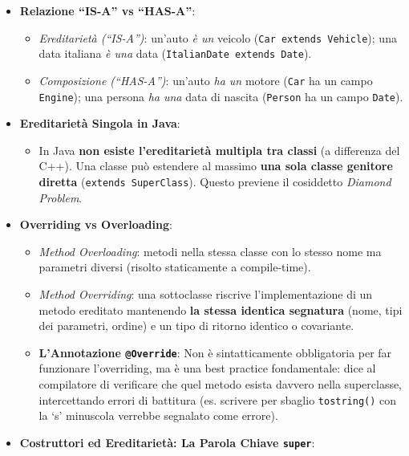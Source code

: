 \documentclass[11pt,a4paper]{article}
\newcommand{\passthrough}[1]{#1}
\providecommand{\tightlist}{\setlength{\itemsep}{0pt}\setlength{\parskip}{0pt}}
\begin{document}
\begin{itemize}
\tightlist
\item
  \textbf{Relazione ``IS-A'' vs ``HAS-A''}:

  \begin{itemize}
  \tightlist
  \item
    \emph{Ereditarietà (``IS-A'')}: un'auto \emph{è un} veicolo
    (\passthrough{\lstinline!Car extends Vehicle!}); una data italiana
    \emph{è una} data
    (\passthrough{\lstinline!ItalianDate extends Date!}).
  \item
    \emph{Composizione (``HAS-A'')}: un'auto \emph{ha un} motore
    (\passthrough{\lstinline!Car!} ha un campo
    \passthrough{\lstinline!Engine!}); una persona \emph{ha una} data di
    nascita (\passthrough{\lstinline!Person!} ha un campo
    \passthrough{\lstinline!Date!}).
  \end{itemize}
\item
  \textbf{Ereditarietà Singola in Java}:

  \begin{itemize}
  \tightlist
  \item
    In Java \textbf{non esiste l'ereditarietà multipla tra classi} (a
    differenza del C++). Una classe può estendere al massimo \textbf{una
    sola classe genitore diretta}
    (\passthrough{\lstinline!extends SuperClass!}). Questo previene il
    cosiddetto \emph{Diamond Problem}.
  \end{itemize}
\item
  \textbf{Overriding vs Overloading}:

  \begin{itemize}
  \tightlist
  \item
    \emph{Method Overloading}: metodi nella stessa classe con lo stesso
    nome ma parametri diversi (risolto staticamente a compile-time).
  \item
    \emph{Method Overriding}: una sottoclasse riscrive l'implementazione
    di un metodo ereditato mantenendo \textbf{la stessa identica
    segnatura} (nome, tipi dei parametri, ordine) e un tipo di ritorno
    identico o covariante.
  \item
    \textbf{L'Annotazione \passthrough{\lstinline!@Override!}}: Non è
    sintatticamente obbligatoria per far funzionare l'overriding, ma è
    una best practice fondamentale: dice al compilatore di verificare
    che quel metodo esista davvero nella superclasse, intercettando
    errori di battitura (es. scrivere per sbaglio
    \passthrough{\lstinline!tostring()!} con la `s' minuscola verrebbe
    segnalato come errore).
  \end{itemize}
\item
  \textbf{Costruttori ed Ereditarietà: La Parola Chiave
  \passthrough{\lstinline!super!}}:


\end{itemize}
\end{document}
